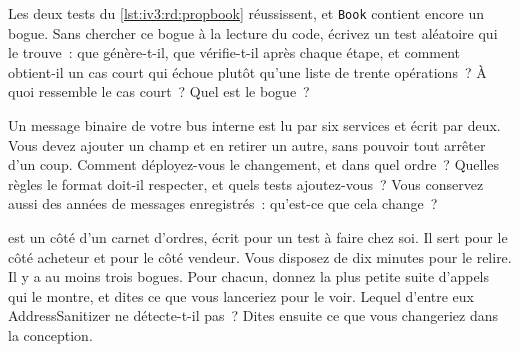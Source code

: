 \begin{question}\label{iq:iv3:reading-debugging-and-software-design:37}
Les deux tests du \cref{lst:iv3:rd:propbook} réussissent, et \texttt{Book} contient encore un bogue. Sans chercher ce bogue à la lecture du code, écrivez un test aléatoire qui le trouve~: que génère-t-il, que vérifie-t-il après chaque étape, et comment obtient-il un cas court qui échoue plutôt qu'une liste de trente opérations~? À quoi ressemble le cas court~? Quel est le bogue~?
\label{lst:iv3:rd:propbook}
\end{question}

\begin{question}\label{iq:iv3:reading-debugging-and-software-design:38}
Un message binaire de votre bus interne est lu par six services et écrit par deux. Vous devez ajouter un champ et en retirer un autre, sans pouvoir tout arrêter d'un coup. Comment déployez-vous le changement, et dans quel ordre~? Quelles règles le format doit-il respecter, et quels tests ajoutez-vous~? Vous conservez aussi des années de messages enregistrés~: qu'est-ce que cela change~?
\end{question}

\begin{question}\label{iq:iv3:reading-debugging-and-software-design:39}
 est un côté d'un carnet d'ordres, écrit pour un test à faire chez soi. Il sert pour le côté acheteur et pour le côté vendeur. Vous disposez de dix minutes pour le relire. Il y a au moins trois bogues. Pour chacun, donnez la plus petite suite d'appels qui le montre, et dites ce que vous lanceriez pour le voir. Lequel d'entre eux AddressSanitizer ne détecte-t-il pas~? Dites ensuite ce que vous changeriez dans la conception.
\label{lst:iv3:rd:bookbugs}
\end{question}


